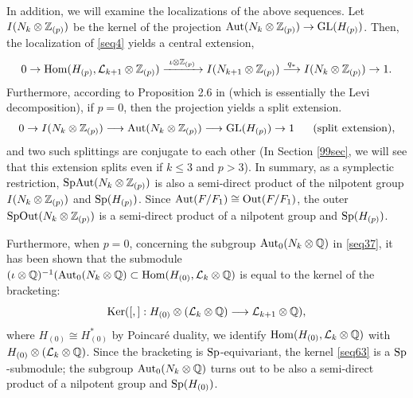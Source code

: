 \documentclass{article}
\theoremstyle{plain}
\theoremstyle{definition}
\def\Qer{\mathop{\mathrm{Ker}}\nolimits}
\def\Hom{\mathop{\mathrm{Hom}}\nolimits}
\newcommand{\lra}{\longrightarrow}
\newcommand{\ra}{\rightarrow}
\newcommand{\Q}{{\Bbb Q}}
\newcommand{\Z}{{\Bbb Z}}
\newcommand{\Aut}{{\rm Aut}}
\newcommand{\Out}{{\rm Out}}
\newcommand{\Sp}{{\rm Sp}}
\newcommand{\GL}{{\rm GL}}
\begin{document}
{In addition, we will examine the localizations of the above sequences. Let $I(N_{k}\otimes \Z_{(p)}) $ be the kernel of the projection $\Aut(N_k \otimes \Z_{(p)}) \ra \GL(H_{(p)})$. Then, the localization of \eqref{seq4} yields a central extension,
\begin{equation}\label{seq5}
0 \ra \Hom ( H_{(p)} , \mathcal{L}_{k+1} \otimes \Z_{(p)}) \xrightarrow{ \ \iota\otimes \Z_{(p)} \ } I(N_{k+1}\otimes \Z_{(p)})
\stackrel{q_* }{\lra } I(N_{k}\otimes \Z_{(p)}) \ra 1.%
\end{equation}
Furthermore, according to Proposition 2.6 in \cite{Mo} (which is essentially the Levi decomposition), if $p = 0$, then the projection yields a split extension.
\begin{equation}\label{seq6}
0 \ra I(N_{k}\otimes \Z_{(p)}) \lra \Aut(N_k \otimes \Z_{(p)})
\lra \GL(H_{(p)}) \ra 1 \ \ \ \ \ (\mathrm{split \ extension}),
\end{equation}
and two such splittings are conjugate to each other (In Section \ref{99sec}, we will see that this extension splits even if $k\leq 3$ and $ p>3$). In summary, as a symplectic restriction, $\mathrm{SpAut}(N_k \otimes \Z_{(p)}) $ is also a semi-direct product of the nilpotent group $I(N_{k}\otimes \Z_{(p)}) $ and $\Sp(H_{(p)}) $. Since $ \Aut(F/F_1) \cong \Out(F/F_1) $, the outer $\mathrm{SpOut}(N_k \otimes \Z_{(p)}) $ is a semi-direct product of a nilpotent group and $\Sp(H_{(p)}) $.

Furthermore, when $p=0$, concerning the subgroup $\Aut_0(N_{k}\otimes \Q ) $ in \eqref{seq37}, it has been shown \cite[Theorem 3.3]{Mo2} that the submodule $
( \iota \otimes \Q)^{-1} (\Aut_0(N_{k}\otimes \Q ) \subset \Hom ( H_{(0)} , \mathcal{L}_k\otimes \Q) $ is equal to the kernel of the bracketing:
\begin{equation}\label{seq63}
\Qer([,]: H_{(0)} \otimes (\mathcal{L}_{k}\otimes \Q) \lra \mathcal{L}_{k+1} \otimes \Q) ,
\end{equation}
where $H_{(0)} \cong H_{(0)}^* $ by Poincar\'{e} duality, we identify $\Hom (H_{(0)} , \mathcal{L}_{k}\otimes \Q)$ with $H_{(0)} \otimes (\mathcal{L}_{k}\otimes \Q) $. Since the bracketing is $\Sp$-equivariant, the kernel \eqref{seq63} is a $\Sp$-submodule; the subgroup $\Aut_0(N_{k}\otimes \Q ) $ turns out to be also a semi-direct product of a nilpotent group and $\Sp(H_{(0)}) $.


}
\end{document}
